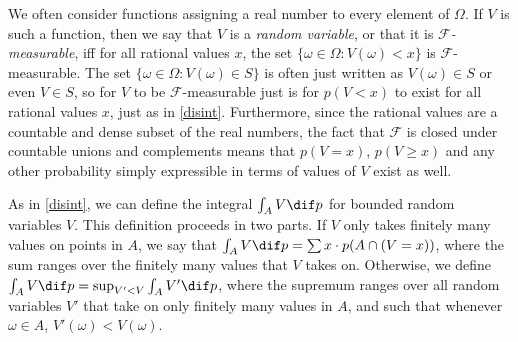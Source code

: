 We often consider functions assigning a real number to every element of $\Omega$. If $V$ is such a function, then we say that $V$ is a \textit{random variable}, or that it is \textit{$\mathcal{F}$-measurable}, iff for all rational values $x$, the set $\{\omega\in\Omega\colon V(\omega)<x\}$ is $\mathcal{F}$-measurable. The set $\{\omega\in\Omega\colon V(\omega)\in S\}$ is often just written as $V(\omega)\in S$ or even $V\in S$, so for $V$ to be $\mathcal{F}$-measurable just is for $p(V<x)$ to exist for all rational values $x$, just as in \autoref{disint}. Furthermore, since the rational values are a countable and dense subset of the real numbers, the fact that $\mathcal{F}$ is closed under countable unions and complements means that $p(V=x)$, $p(V\geq x)$ and any other probability simply expressible in terms of values of $V$ exist as well.

As in \autoref{disint}, we can define the integral $\int_A V \dif p$ for bounded random variables $V$. This definition proceeds in two parts. If $V$ only takes finitely many values on points in $A$, we say that $\int_A V \dif p=\sum x\cdot p(A\cap (V=x))$, where the sum ranges over the finitely many values that $V$ takes on. Otherwise, we define $\int_A V \dif p=\sup_{V'<V}\int_A V' \dif p$, where the supremum ranges over all random variables $V'$ that take on only finitely many values in $A$, and such that whenever $\omega\in A$, $V'(\omega)<V(\omega)$.

